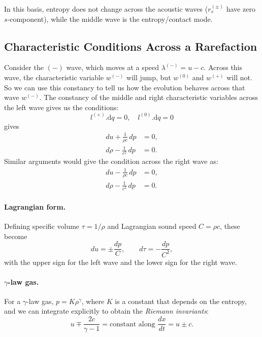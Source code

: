 \documentclass{article}
\begin{document}
In this basis, entropy does not change across the acoustic waves ($r^{(\pm)}_s$ have zero $s$‑component), while the middle wave is the entropy/contact mode. 

\subsection*{Characteristic Conditions Across a Rarefaction}
Consider the $(-)$ wave, which moves at a speed $\lambda^{(-)}=u-c$. Across this wave, the characteristic variable $w^{(-)}$ will jump, but $w^{(0)}$ and $w^{(+)}$ will not. So we can use this constancy to tell us how the evolution behaves across that wave $w^{(-)}$. The constancy of the middle and right characteristic variables across the left wave gives us the conditions:
\[
l^{(+)}.\mathrm{d}q=0, \quad l^{(0)}.\mathrm{d}q=0
\]
gives
\begin{align}
du + \frac{1}{\rho c}\, dp &= 0, \label{eq:left-rare-u} \\
d\rho - \frac{1}{c^2}\, dp &= 0. \label{eq:left-rare-rho}
\end{align}
Similar arguments would give the condition across the right wave as:
\begin{align}
du - \frac{1}{\rho c}\, dp &= 0, \\
d\rho - \frac{1}{c^2}\, dp &= 0.
\end{align}

\paragraph{Lagrangian form.}
Defining specific volume $\tau = 1/\rho$ and Lagrangian sound speed $C=\rho c$,
these become
\[
du = \pm \frac{dp}{C}, 
\qquad d\tau = -\frac{dp}{C^2},
\]
with the upper sign for the left wave and the lower sign for the right wave.

\paragraph{$\gamma$-law gas.}
For a $\gamma$-law gas, $p=K\rho^\gamma$, where $K$ is a constant that depends on the entropy, and we can integrate explicitly to obtain the \emph{Riemann invariants}:
\[
u \mp \frac{2c}{\gamma-1} = \text{constant along } \frac{dx}{dt} = u \pm c.
\]
\end{document}
